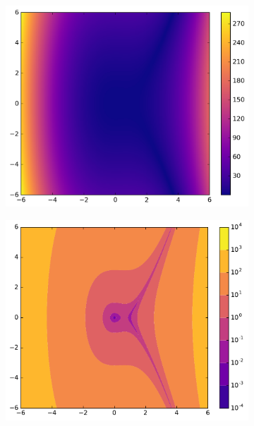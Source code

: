\begin{figure}[H] %
\centering
\begin{subfigure}{.495\textwidth}
    \centering
    \includegraphics[width=\linewidth]{figures/heatmap_3.pdf}
\end{subfigure}
%
\begin{subfigure}{.495\textwidth}
    \centering
    \includegraphics[width=\linewidth]{figures/contour_3.pdf}
\end{subfigure}
\end{figure}

